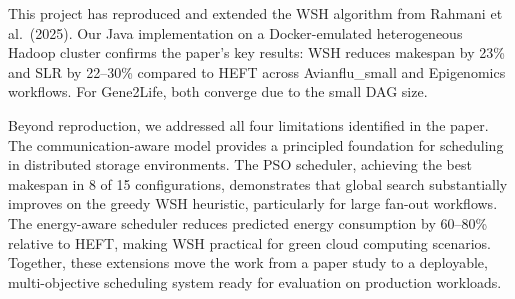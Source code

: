 \documentclass[12pt,a4paper]{article}
\begin{document}
This project has reproduced and extended the WSH algorithm from Rahmani et al.\ (2025). Our Java implementation on a Docker-emulated heterogeneous Hadoop cluster confirms the paper's key results: WSH reduces makespan by 23\% and SLR by 22--30\% compared to HEFT across Avianflu\_small and Epigenomics workflows. For Gene2Life, both converge due to the small DAG size.

Beyond reproduction, we addressed all four limitations identified in the paper. The communication-aware model provides a principled foundation for scheduling in distributed storage environments. The PSO scheduler, achieving the best makespan in 8 of 15 configurations, demonstrates that global search substantially improves on the greedy WSH heuristic, particularly for large fan-out workflows. The energy-aware scheduler reduces predicted energy consumption by 60--80\% relative to HEFT, making WSH practical for green cloud computing scenarios. Together, these extensions move the work from a paper study to a deployable, multi-objective scheduling system ready for evaluation on production workloads.
\end{document}
